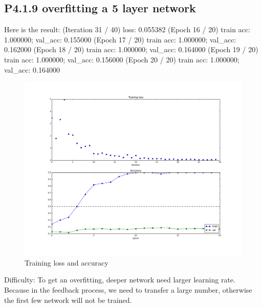 \documentclass[12pt]{article}
\begin{document}
\subsection*{P4.1.9 overfitting a 5 layer network}
Here is the result:
(Iteration 31 / 40) loss: 0.055382
(Epoch 16 / 20) train acc: 1.000000; val\_acc: 0.155000
(Epoch 17 / 20) train acc: 1.000000; val\_acc: 0.162000
(Epoch 18 / 20) train acc: 1.000000; val\_acc: 0.164000
(Epoch 19 / 20) train acc: 1.000000; val\_acc: 0.156000
(Epoch 20 / 20) train acc: 1.000000; val\_acc: 0.164000

\begin{figure}[H]
  \caption{Training loss and accuracy}
  \centering
    \includegraphics[scale=0.5]{fivetrainingandacc.png}
\end{figure}


Difficulty:
To get an overfitting, deeper network need larger learning rate. Because in the feedback process, we need to transfer a large number, otherwise the first few network will not be trained.
\end{document}
